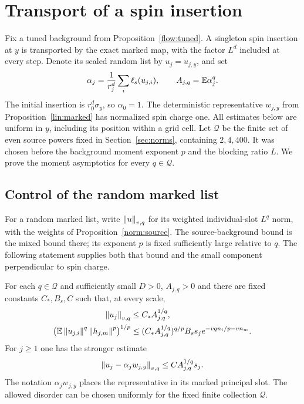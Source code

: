 \section{Transport of a spin insertion}\label{sec:marked}
Fix a tuned background from Proposition~\ref{flow:tuned}.  A singleton
spin insertion at $y$ is transported by the exact marked map, with the
factor $L^d$ included at every step.  Denote its scaled random list by
$u_j=u_{j,y}$, and set
\begin{equation}\label{mark:charge}
 \alpha_j=\frac1{r_j^d}\sum_i \ell_s(u_{j,i}),\qquad
 A_{j,q}=\mathbb E\alpha_j^q.
\end{equation}
The initial insertion is $r_0^d\sigma_y$, so $\alpha_0=1$.
The deterministic representative $w_{j,y}$ from
Proposition~\ref{lin:marked} has normalized spin charge one.  All estimates
below are uniform in $y$, including its position within a grid cell.
Let $\mathcal Q$ be the finite set of even source powers fixed in
Section~\ref{sec:norms}, containing $2,4,400$.  It was chosen before
the background moment exponent $p$ and the blocking ratio $L$.
We prove the moment asymptotics for every $q\in\mathcal Q$.

\subsection{Control of the random marked list}
For a random marked list, write $\left\lVert u\right\rVert_{v,q}$ for its weighted
individual-slot $L^q$ norm, with the weights of
Proposition~\ref{norm:source}.  The source-background bound is the mixed
bound there; its exponent $p$ is fixed sufficiently large relative to
$q$.  The following statement supplies both that bound and the small
component perpendicular to spin charge.

\begin{proposition}\label{mark:kernel}
For each $q\in\mathcal Q$ and sufficiently small $D>0$, $A_{j,q}>0$
and there are fixed constants $C_*,B_s,C$ such that, at every scale,
\begin{align}
 \left\lVert u_j\right\rVert_{v,q}&\le C_*A_{j,q}^{1/q},\label{mark:lq}\\
 \bigl(\mathbb E\left\lVert u_{j,i}\right\rVert^q\left\lVert h_{j,m}\right\rVert^p\bigr)^{1/p}
 &\le (C_*A_{j,q}^{1/q})^{q/p}B_s s_j
       e^{-vq n_i/p-vn_m}.\label{mark:mixed}
\end{align}
For $j\ge1$ one has the stronger estimate
\begin{equation}\label{mark:kernel-small}
 \left\lVert u_j-\alpha_jw_{j,y}\right\rVert_{v,q}
       \le C A_{j,q}^{1/q}s_j.
\end{equation}
The notation $\alpha_jw_{j,y}$ places the representative in its marked
principal slot.  The allowed disorder can be chosen uniformly for
the fixed finite collection $\mathcal Q$.
\end{proposition}

